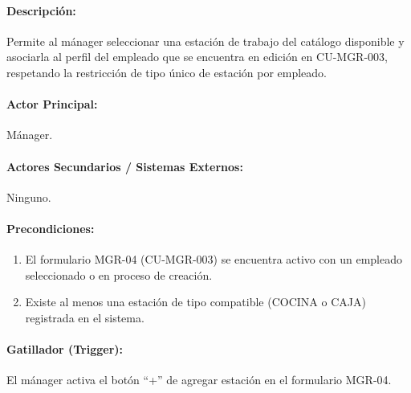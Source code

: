 \paragraph{Descripción:} Permite al mánager seleccionar una estación de trabajo del catálogo disponible y asociarla al perfil del empleado que se encuentra en edición en CU-MGR-003, respetando la restricción de tipo único de estación por empleado.

\paragraph{Actor Principal:} Mánager.

\paragraph{Actores Secundarios / Sistemas Externos:} Ninguno.

\paragraph{Precondiciones:}
\begin{enumerate}
    \item[I.] El formulario MGR-04 (CU-MGR-003) se encuentra activo con un empleado seleccionado o en proceso de creación.
    \item[II.] Existe al menos una estación de tipo compatible (COCINA o CAJA) registrada en el sistema.
\end{enumerate}

\paragraph{Gatillador (Trigger):} El mánager activa el botón ``+'' de agregar estación en el formulario MGR-04.

